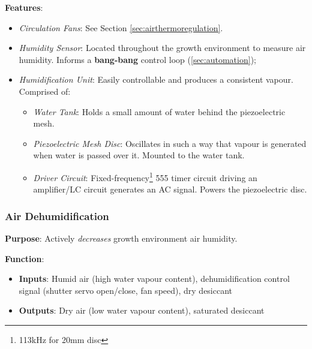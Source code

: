 \documentclass{report}
\begin{document}
\textbf{Features}:
\begin{itemize}
    \item \textit{Circulation Fans}: See Section \ref{sec:airthermoregulation}.
    \item \textit{Humidity Sensor}: Located throughout the growth environment to measure air humidity. Informs a \textbf{bang-bang} control loop (\ref{sec:automation});
    \item \textit{Humidification Unit}: Easily controllable and produces a consistent vapour. Comprised of:
    \begin{itemize}
        \item \textit{Water Tank}: Holds a small amount of water behind the piezoelectric mesh.
        \item \textit{Piezoelectric Mesh Disc}: Oscillates in such a way that vapour is generated when water is passed over it. Mounted to the water tank.
        \item \textit{Driver Circuit}: Fixed-frequency\footnote{113kHz for 20mm disc} 555 timer circuit driving an amplifier/LC circuit generates an AC signal. Powers the piezoelectric disc.
    \end{itemize}
\end{itemize}

\newpage

\subsubsection{Air Dehumidification}
\label{sec:dehum}

\textbf{Purpose}: Actively \textit{decreases} growth environment air humidity.

\textbf{Function}:
\begin{itemize}
    \item \textbf{Inputs}: Humid air (high water vapour content), dehumidification control signal (shutter servo open/close, fan speed), dry desiccant
    \item \textbf{Outputs}: Dry air (low water vapour content), saturated desiccant
\end{itemize}
\end{document}

